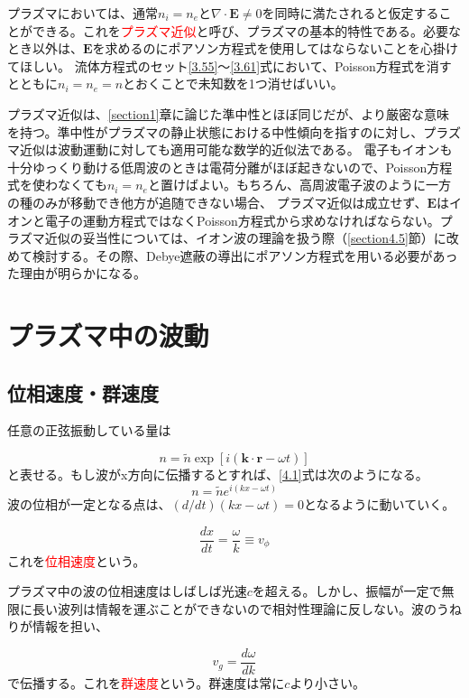 \documentclass{ltjsarticle}
\numberwithin{equation}{section} %
\begin{document}
プラズマにおいては、通常$n_i = n_e$と$\nabla \cdot \bm{E}\neq 0$を同時に満たされると仮定することができる。これを\textcolor{red}{プラズマ近似}と呼び、プラズマの基本的特性である。必要なとき以外は、$\bm{E}$を求めるのにポアソン方程式を使用してはならないことを心掛けてほしい。
流体方程式のセット\eqref{3.55}～\eqref{3.61}式において、Poisson方程式を消すとともに$n_i=n_e=n$とおくことで未知数を1つ消せばいい。

プラズマ近似は、\ref{section1}章に論じた準中性とほぼ同じだが、より厳密な意味を持つ。準中性がプラズマの静止状態における中性傾向を指すのに対し、プラズマ近似は波動運動に対しても適用可能な数学的近似法である。
電子もイオンも十分ゆっくり動ける低周波のときは電荷分離がほぼ起きないので、Poisson方程式を使わなくても$n_i = n_e$と置けばよい。もちろん、高周波電子波のように一方の種のみが移動でき他方が追随できない場合、
プラズマ近似は成立せず、$\bm{E}$はイオンと電子の運動方程式ではなくPoisson方程式から求めなければならない。プラズマ近似の妥当性については、イオン波の理論を扱う際（\ref{section4.5}節）に改めて検討する。その際、Debye遮蔽の導出にポアソン方程式を用いる必要があった理由が明らかになる。


\section{プラズマ中の波動} \label{section4}
\subsection{位相速度・群速度} \label{section4.1}
任意の正弦振動している量は

\begin{equation}
  n = \tilde{n}\exp[i(\bm{k}\cdot \bm{r} - \omega t)] \label{4.1}
\end{equation}
と表せる。もし波がx方向に伝播するとすれば、\eqref{4.1}式は次のようになる。
\[
   n = \tilde{n}e^{i(kx - \omega t)}
\]
波の位相が一定となる点は、$(d/dt)(kx-\omega t)=0$となるように動いていく。

\begin{equation}
  \boxed{\frac{dx}{dt} = \frac{\omega}{k} \equiv v_\phi} \label{4.4}
\end{equation}
これを\textcolor{red}{位相速度}という。

プラズマ中の波の位相速度はしばしば光速$c$を超える。しかし、振幅が一定で無限に長い波列は情報を運ぶことができないので相対性理論に反しない。波のうねりが情報を担い、

\begin{equation}
  \boxed{v_g = \frac{d\omega}{dk}} \label{4.10}
\end{equation}
で伝播する。これを\textcolor{red}{群速度}という。群速度は常に$c$より小さい。
\end{document}
